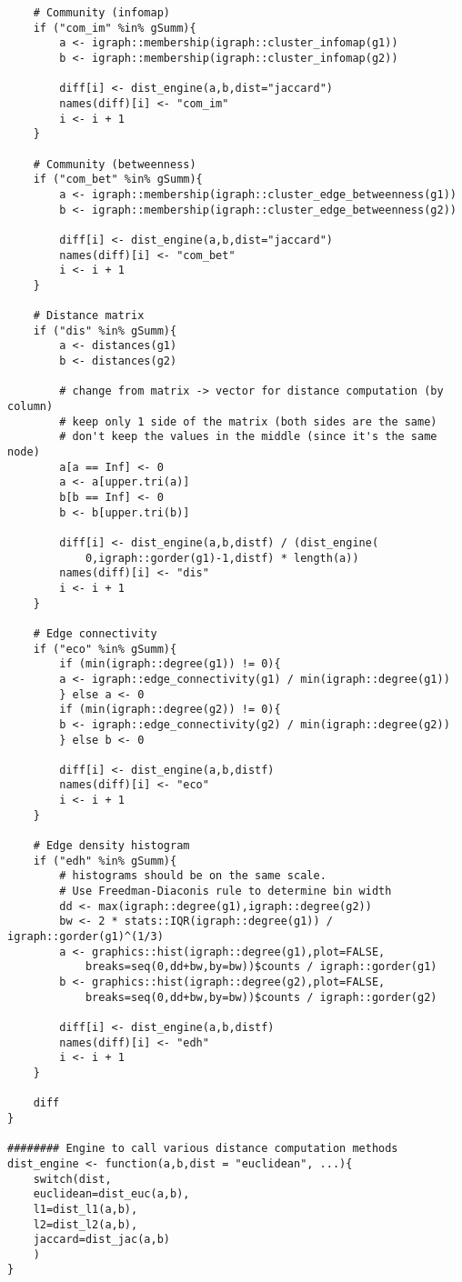 {\begin{lstlisting}
	# Community (infomap)
	if ("com_im" %in% gSumm){
		a <- igraph::membership(igraph::cluster_infomap(g1))
		b <- igraph::membership(igraph::cluster_infomap(g2))
		
		diff[i] <- dist_engine(a,b,dist="jaccard")
		names(diff)[i] <- "com_im"
		i <- i + 1
	}
	
	# Community (betweenness)
	if ("com_bet" %in% gSumm){
		a <- igraph::membership(igraph::cluster_edge_betweenness(g1))
		b <- igraph::membership(igraph::cluster_edge_betweenness(g2))
		
		diff[i] <- dist_engine(a,b,dist="jaccard")
		names(diff)[i] <- "com_bet"
		i <- i + 1
	}
	
	# Distance matrix 
	if ("dis" %in% gSumm){
	    a <- distances(g1)
	    b <- distances(g2)
	    
	    # change from matrix -> vector for distance computation (by column)
	    # keep only 1 side of the matrix (both sides are the same)
	    # don't keep the values in the middle (since it's the same node)
	    a[a == Inf] <- 0
	    a <- a[upper.tri(a)]
	    b[b == Inf] <- 0
	    b <- b[upper.tri(b)]
	    
	    diff[i] <- dist_engine(a,b,distf) / (dist_engine(
		    0,igraph::gorder(g1)-1,distf) * length(a))
	    names(diff)[i] <- "dis"
	    i <- i + 1
	}
	
	# Edge connectivity 
	if ("eco" %in% gSumm){
		if (min(igraph::degree(g1)) != 0){
		a <- igraph::edge_connectivity(g1) / min(igraph::degree(g1))
		} else a <- 0
		if (min(igraph::degree(g2)) != 0){
		b <- igraph::edge_connectivity(g2) / min(igraph::degree(g2))
		} else b <- 0
		
		diff[i] <- dist_engine(a,b,distf)
		names(diff)[i] <- "eco"
		i <- i + 1
	}
	
	# Edge density histogram
	if ("edh" %in% gSumm){
		# histograms should be on the same scale. 
		# Use Freedman-Diaconis rule to determine bin width
		dd <- max(igraph::degree(g1),igraph::degree(g2))
		bw <- 2 * stats::IQR(igraph::degree(g1)) / igraph::gorder(g1)^(1/3)
		a <- graphics::hist(igraph::degree(g1),plot=FALSE,
			breaks=seq(0,dd+bw,by=bw))$counts / igraph::gorder(g1)
		b <- graphics::hist(igraph::degree(g2),plot=FALSE,
			breaks=seq(0,dd+bw,by=bw))$counts / igraph::gorder(g2)
		
		diff[i] <- dist_engine(a,b,distf)
		names(diff)[i] <- "edh"
		i <- i + 1
	}
	
	diff
}

######## Engine to call various distance computation methods
dist_engine <- function(a,b,dist = "euclidean", ...){
	switch(dist,
	euclidean=dist_euc(a,b),
	l1=dist_l1(a,b),
	l2=dist_l2(a,b),
	jaccard=dist_jac(a,b)
	)
}


\end{lstlisting}}
